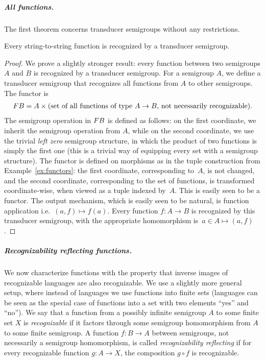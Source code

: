 \subparagraph{All functions.} The first theorem concerns transducer semigroups without any restrictions.

\begin{theorem}\label{thm:all-functions} 
 Every string-to-string function is recognized by a transducer semigroup.
\end{theorem}
\begin{proof}
 We prove a slightly stronger result: every function between two semigroups $A$ and $B$ is recognized by a transducer semigroup.
 For a semigroup $A$, we define a transducer semigroup that recognizes all functions from $A$ to other semigroups. The functor is 
 \begin{align*}
 \functor B = A \times \text{(set of all functions of type $A \to B$, not necessarily recognizable)}.
 \end{align*}
 The semigroup operation in $\functor B$ is defined as follows: on the first coordinate, we inherit the semigroup operation from $A$, while on the second coordinate, we use the trivial \emph{left zero} semigroup structure, in which  the product of two functions is simply the first one (this is a trivial way of equipping every set with a semigroup structure). The functor is defined on morphisms
as in the tuple construction from Example~\ref{ex:functors}: the first coordinate, corresponding to~$A$, is not changed, and the second coordinate, corresponding to the set of functions, is transformed coordinate-wise, when viewed as a tuple indexed by~$A$. This is easily seen to be a functor. The output mechanism, which is easily seen to be natural, is function application i.e.~$(a,f) \mapsto f(a)$.
Every function $f\colon A \to B$ is recognized by this transducer semigroup, with the appropriate homomorphism is~$a \in A \mapsto (a,f)$.
\end{proof}

\subparagraph{Recognizability reflecting functions.} We now characterize functions with the property that inverse images of recognizable languages are also recognizable. We use a slightly more general setup, where instead of languages we use functions into finite sets (languages can be seen as the special case of functions into a set with two elements ``yes'' and ``no''). We say that a function from a possibly infinite semigroup $A$ to some finite set $X$ is \emph{recognizable} if it factors through some semigroup homomorphism from $A$ to some finite semigroup. 
 A function $f\colon B \to A$ between semigroups, not necessarily a semigroup homomorphism, is called \emph{recognizability reflecting} if for every recognizable function $g\colon A \to X$, the composition $g \circ f$ is recognizable. 



